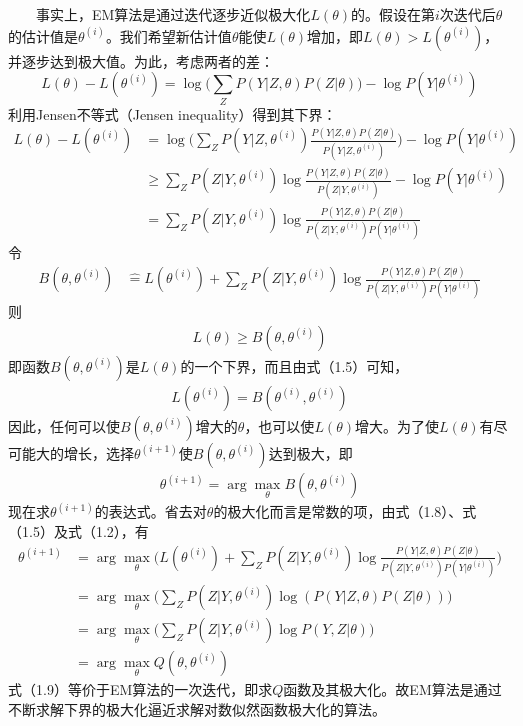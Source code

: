 \documentclass[
  12pt,
]{article}
\begin{document}
　　事实上，EM算法是通过迭代逐步近似极大化\(L(\theta)\)的。假设在第\(i\)次迭代后\(\theta\)的估计值是\(\theta^{(i)}\)。我们希望新估计值\(\theta\)能使\(L(\theta)\)增加，即\(L(\theta)>L(\theta^{(i)})\)，并逐步达到极大值。为此，考虑两者的差：
\[
L(\theta)-L(\theta^{(i)})=\log{\bigg(\sum_{Z}{P(Y|Z,\theta)P(Z|\theta)}\bigg)}-\log{P(Y|\theta^{(i)})}
\] 利用Jensen不等式（Jensen inequality）得到其下界： \[
\begin{split}
L(\theta)-L(\theta^{(i)})
&=\log{\bigg(\sum_{Z}{P(Y|Z,\theta^{(i)})\frac{P(Y|Z,\theta)P(Z|\theta)}{P(Y|Z,\theta^{(i)})}}\bigg)}-\log{P(Y|\theta^{(i)})}\\
&\geqslant\sum_{Z}{P(Z|Y,\theta^{(i)})\log{\frac{P(Y|Z,\theta)P(Z|\theta)}{P(Z|Y,\theta^{(i)})}}}-\log{P(Y|\theta^{(i)})}\\
&=\sum_{Z}{P(Z|Y,\theta^{(i)})\log{\frac{P(Y|Z,\theta)P(Z|\theta)}{P(Z|Y,\theta^{(i)})P(Y|\theta^{(i)})}}}
\end{split}
\] 令 \[
\begin{split}
B(\theta,\theta^{(i)})
&\hat{=}L(\theta^{(i)})+\sum_{Z}{P(Z|Y,\theta^{(i)})\log{\frac{P(Y|Z,\theta)P(Z|\theta)}{P(Z|Y,\theta^{(i)})P(Y|\theta^{(i)})}}}
\end{split}
\tag{1.5}
\] 则 \[
\begin{split}
L(\theta)\geqslant B(\theta,\theta^{(i)})
\end{split}
\tag{1.6}
\]
即函数\(B(\theta,\theta^{(i)})\)是\(L(\theta)\)的一个下界，而且由式（1.5）可知，
\[
\begin{split}
L(\theta^{(i)})=B(\theta^{(i)},\theta^{(i)})
\end{split}
\tag{1.7}
\]
因此，任何可以使\(B(\theta,\theta^{(i)})\)增大的\(\theta\)，也可以使\(L(\theta)\)增大。为了使\(L(\theta)\)有尽可能大的增长，选择\(\theta^{(i+1)}\)使\(B(\theta,\theta^{(i)})\)达到极大，即
\[
\begin{split}
\theta^{(i+1)}=\arg{\max_{\theta}B(\theta,\theta^{(i)})}
\end{split}
\tag{1.8}
\]
现在求\(\theta^{(i+1)}\)的表达式。省去对\(\theta\)的极大化而言是常数的项，由式（1.8）、式（1.5）及式（1.2），有
\[
\begin{split}
\theta^{(i+1)}
&=\arg{\max_{\theta}{\bigg(L(\theta^{(i)})+\sum_{Z}{P(Z|Y,\theta^{(i)})\log{\frac{P(Y|Z,\theta)P(Z|\theta)}{P(Z|Y,\theta^{(i)})P(Y|\theta^{(i)})}}}\bigg)}}\\
&=\arg{\max_{\theta}{\bigg(\sum_{Z}{P(Z|Y,\theta^{(i)})\log{(P(Y|Z,\theta)P(Z|\theta))}}\bigg)}}\\
&=\arg{\max_{\theta}{\bigg(\sum_{Z}{P(Z|Y,\theta^{(i)})\log{P(Y,Z|\theta)}}\bigg)}}\\
&=\arg{\max_{\theta}{Q(\theta,\theta^{(i)})}}
\end{split}
\tag{1.9}
\]
式（1.9）等价于EM算法的一次迭代，即求\(Q\)函数及其极大化。故EM算法是通过不断求解下界的极大化逼近求解对数似然函数极大化的算法。
\end{document}
